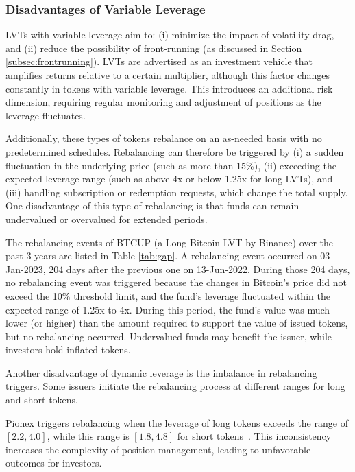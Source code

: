 \subsubsection{Disadvantages of Variable Leverage}
LVTs with variable leverage aim to: (i) minimize the impact of volatility drag, and (ii) reduce the possibility of front-running (as discussed in Section \ref{subsec:frontrunning}). LVTs are advertised as an investment vehicle that amplifies returns relative to a certain multiplier, although this factor changes constantly in tokens with variable leverage. This introduces an additional risk dimension, requiring regular monitoring and adjustment of positions as the leverage fluctuates. 

Additionally, these types of tokens rebalance on an as-needed basis with no predetermined schedules. Rebalancing can therefore be triggered by (i) a sudden fluctuation in the underlying price (such as more than 15\%), (ii) exceeding the expected leverage range (such as above 4x or below 1.25x for long LVTs), and (iii) handling subscription or redemption requests, which change the total supply. One disadvantage of this type of rebalancing is that funds can remain undervalued or overvalued for extended periods.


\begin{example}
	The rebalancing events of BTCUP (a Long Bitcoin LVT by Binance) over the past 3 years are listed in Table \ref{tab:gap}. A rebalancing event occurred on 03-Jan-2023, 204 days after the previous one on 13-Jun-2022. During those 204 days, no rebalancing event was triggered because the changes in Bitcoin’s price did not exceed the 10\% threshold limit, and the fund’s leverage fluctuated within the expected range of 1.25x to 4x. During this period, the fund’s value was much lower (or higher) than the amount required to support the value of issued tokens, but no rebalancing occurred. Undervalued funds may benefit the issuer, while investors hold inflated tokens.
\end{example}

Another disadvantage of dynamic leverage is the imbalance in rebalancing triggers. Some issuers initiate the rebalancing process at different ranges for long and short tokens.
\begin{example}
	Pionex triggers rebalancing when the leverage of long tokens exceeds the range of $\left[2.2, 4.0\right]$, while this range is $\left[1.8, 4.8\right]$ for short tokens~\cite{Pionex}. This inconsistency increases the complexity of position management, leading to unfavorable outcomes for investors.
\end{example}

